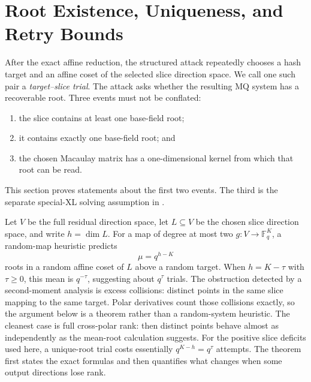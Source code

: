 \documentclass[11pt]{article}
\newcommand{\F}{\mathbb F}
\begin{document}
\section{Root Existence, Uniqueness, and Retry Bounds}\label{sec:slices}

After the exact affine reduction, the structured attack repeatedly chooses a
hash target and an affine coset of the selected slice direction space.  We call
one such pair a \emph{target--slice trial}.  The attack asks whether the
resulting MQ system has a recoverable root.  Three events must not be conflated:
\begin{enumerate}[label=(\roman*),itemsep=2pt]
\item the slice contains at least one base-field root;
\item it contains exactly one base-field root; and
\item the chosen Macaulay matrix has a one-dimensional kernel from which that
      root can be read.
\end{enumerate}
This section proves statements about the first two events.  The third is the
separate special-XL solving assumption in .

Let $V$ be the full residual direction space, let $L\subseteq V$ be the chosen
slice direction space, and write $h=\dim L$.  For a map of degree at most two
$g:V\to\F_q^K$, a random-map heuristic predicts
\[
  \mu=q^{h-K}
\]
roots in a random affine coset of $L$ above a random target.  When $h=K-\tau$ with $\tau\ge0$, this mean is $q^{-\tau}$, suggesting
about $q^\tau$ trials.  The obstruction detected by a second-moment analysis is excess
collisions: distinct points in the same slice mapping to the same target.
Polar derivatives count those collisions exactly, so the argument below is a
theorem rather than a random-system heuristic.  The cleanest case is full
cross-polar rank: then distinct points behave almost as independently as the
mean-root calculation suggests.  For the positive slice deficits used here, a
unique-root trial costs essentially $q^{K-h}=q^\tau$ attempts.  The theorem first states the exact formulas and
then quantifies what changes when some output directions lose rank.
\end{document}
